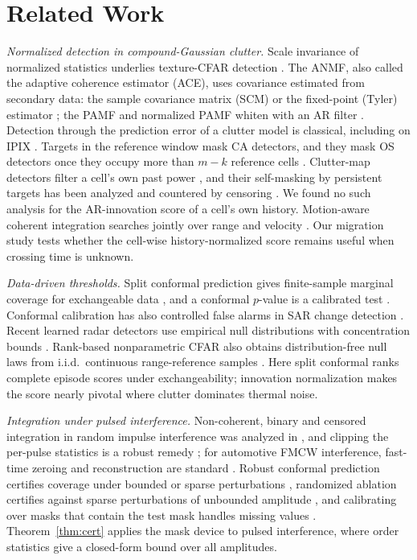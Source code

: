 \documentclass[journal]{IEEEtran}
\begin{document}
\section{Related Work}\label{sec:related}
\emph{Normalized detection in compound-Gaussian clutter.} Scale invariance of normalized statistics underlies texture-CFAR detection \cite{conte1995,kraut1999,ollila2012}. The ANMF, also called the adaptive coherence estimator (ACE), uses covariance estimated from secondary data: the sample covariance matrix (SCM) \cite{kraut1999} or the fixed-point (Tyler) estimator \cite{pascal2008fp}; the PAMF and normalized PAMF whiten with an AR filter \cite{roman2000,michels2000}. Detection through the prediction error of a clutter model is classical, including on IPIX \cite{haykin1995}. Targets in the reference window mask CA detectors, and they mask OS detectors once they occupy more than $m-k$ reference cells \cite{rohling1983,gandhi1988}. Clutter-map detectors filter a cell's own past power \cite{lops1989}, and their self-masking by persistent targets has been analyzed and countered by censoring \cite{naldi1999}. We found no such analysis for the AR-innovation score of a cell's own history. Motion-aware coherent integration searches jointly over range and velocity \cite{xu2011rft}. Our migration study tests whether the cell-wise history-normalized score remains useful when crossing time is unknown.

\emph{Data-driven thresholds.} Split conformal prediction gives finite-sample marginal coverage for exchangeable data \cite{lei2018,vovk2012}, and a conformal $p$-value is a calibrated test \cite{bates2023}. Conformal calibration has also controlled false alarms in SAR change detection \cite{bultingaire2024sar}. Recent learned radar detectors use empirical null distributions with concentration bounds \cite{rouzoumka2026ood}. Rank-based nonparametric CFAR also obtains distribution-free null laws from i.i.d.\ continuous range-reference samples \cite{meng2026rank}. Here split conformal ranks complete episode scores under exchangeability; innovation normalization makes the score nearly pivotal where clutter dominates thermal noise.

\emph{Integration under pulsed interference.} Non-coherent, binary and censored integration in random impulse interference was analyzed in \cite{himonas1994api}, and clipping the per-pulse statistics is a robust remedy \cite{abbasi2018clip}; for automotive FMCW interference, fast-time zeroing and reconstruction are standard \cite{toth2019comp,rameez2021ar}. Robust conformal prediction certifies coverage under bounded or sparse perturbations \cite{gendler2022arcp,zargarbashi2024robust}, randomized ablation certifies against sparse perturbations of unbounded amplitude \cite{levine2020ablation}, and calibrating over masks that contain the test mask handles missing values \cite{zaffran2023missing}. Theorem~\ref{thm:cert} applies the mask device to pulsed interference, where order statistics give a closed-form bound over all amplitudes.
\end{document}
